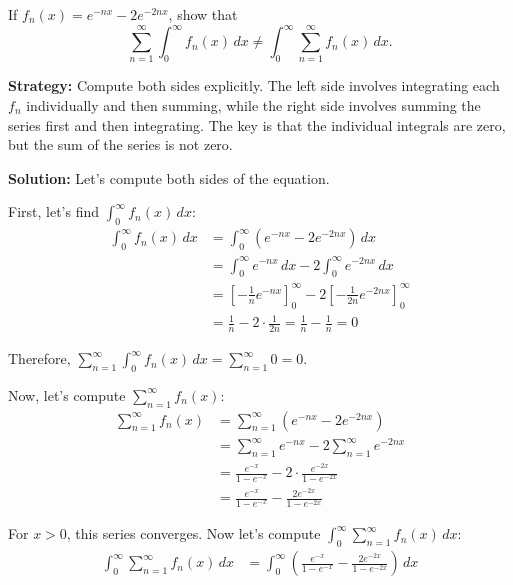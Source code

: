 \begin{problembox}
\begin{problemstatement}
If $f_n(x) = e^{-nx} - 2e^{-2nx}$, show that 
\[\sum_{n=1}^{\infty} \int_{0}^{\infty} f_n(x) \, dx \neq \int_{0}^{\infty} \sum_{n=1}^{\infty} f_n(x) \, dx.\]
\end{problemstatement}
\end{problembox}

\noindent\textbf{Strategy:} Compute both sides explicitly. The left side involves integrating each $f_n$ individually and then summing, while the right side involves summing the series first and then integrating. The key is that the individual integrals are zero, but the sum of the series is not zero.

\bigskip\noindent\textbf{Solution:}
Let's compute both sides of the equation.

First, let's find $\int_{0}^{\infty} f_n(x) \, dx$:
\begin{align*}
\int_{0}^{\infty} f_n(x) \, dx &= \int_{0}^{\infty} (e^{-nx} - 2e^{-2nx}) \, dx \\
&= \int_{0}^{\infty} e^{-nx} \, dx - 2\int_{0}^{\infty} e^{-2nx} \, dx \\
&= \left[-\frac{1}{n}e^{-nx}\right]_{0}^{\infty} - 2\left[-\frac{1}{2n}e^{-2nx}\right]_{0}^{\infty} \\
&= \frac{1}{n} - 2 \cdot \frac{1}{2n} = \frac{1}{n} - \frac{1}{n} = 0
\end{align*}

Therefore, $\sum_{n=1}^{\infty} \int_{0}^{\infty} f_n(x) \, dx = \sum_{n=1}^{\infty} 0 = 0$.

Now, let's compute $\sum_{n=1}^{\infty} f_n(x)$:
\begin{align*}
\sum_{n=1}^{\infty} f_n(x) &= \sum_{n=1}^{\infty} (e^{-nx} - 2e^{-2nx}) \\
&= \sum_{n=1}^{\infty} e^{-nx} - 2\sum_{n=1}^{\infty} e^{-2nx} \\
&= \frac{e^{-x}}{1 - e^{-x}} - 2 \cdot \frac{e^{-2x}}{1 - e^{-2x}} \\
&= \frac{e^{-x}}{1 - e^{-x}} - \frac{2e^{-2x}}{1 - e^{-2x}}
\end{align*}

For $x > 0$, this series converges. Now let's compute $\int_{0}^{\infty} \sum_{n=1}^{\infty} f_n(x) \, dx$:
\begin{align*}
\int_{0}^{\infty} \sum_{n=1}^{\infty} f_n(x) \, dx &= \int_{0}^{\infty} \left(\frac{e^{-x}}{1 - e^{-x}} - \frac{2e^{-2x}}{1 - e^{-2x}}\right) \, dx
\end{align*}

